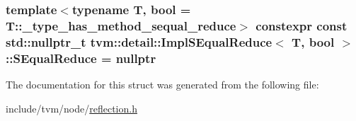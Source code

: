 \subsubsection[{\texorpdfstring{S\+Equal\+Reduce}{SEqualReduce}}]{\setlength{\rightskip}{0pt plus 5cm}template$<$typename T, bool  = T\+::\+\_\+type\+\_\+has\+\_\+method\+\_\+sequal\+\_\+reduce$>$ constexpr const std\+::nullptr\+\_\+t {\bf tvm\+::detail\+::\+Impl\+S\+Equal\+Reduce}$<$ T, bool $>$\+::S\+Equal\+Reduce = nullptr\hspace{0.3cm}{\ttfamily [static]}}\hypertarget{structtvm_1_1detail_1_1ImplSEqualReduce_a2069b17f164be27516b0ca7b53b74d49}{}\label{structtvm_1_1detail_1_1ImplSEqualReduce_a2069b17f164be27516b0ca7b53b74d49}


The documentation for this struct was generated from the following file\+:\begin{DoxyCompactItemize}
\item 
include/tvm/node/\hyperlink{reflection_8h}{reflection.\+h}\end{DoxyCompactItemize}

